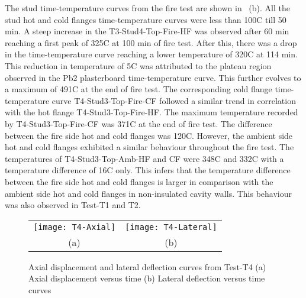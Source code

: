The stud time-temperature curves from the fire test are shown in ~(b). All the stud hot and cold flanges time-temperature curves were less than 100\degree C till 50 min. A steep increase in the T3-Stud4-Top-Fire-HF was observed after 60 min reaching a first peak of 325\degree C at 100 min of fire test. After this, there was a drop in the time-temperature curve reaching a lower temperature of 320\degree C at 114 min. This reduction in temperature of 5\degree C was attributed to the plateau region observed in the Pb2 plasterboard time-temperature curve. This further evolves to a maximum of 491\degree C at the end of fire test. The corresponding cold flange time-temperature curve T4-Stud3-Top-Fire-CF followed a similar trend in correlation with the hot flange T4-Stud3-Top-Fire-HF. The maximum temperature recorded by T4-Stud3-Top-Fire-CF was 371\degree C at the end of fire test. The difference between the fire side hot and cold flanges was 120\degree C. However, the ambient side hot and cold flanges exhibited a similar behaviour throughout the fire test. The temperatures of T4-Stud3-Top-Amb-HF and CF were 348\degree C and 332\degree C with a temperature difference of 16\degree C only. This infers that the temperature difference between the fire side hot and cold flanges is larger in comparison with the ambient side hot and cold flanges in non-insulated cavity walls. This behaviour was also observed in Test-T1 and T2.
\begin{figure}[!htbp]
	\centering
		\begin{tabular}{cc}
			\texttt{[image: T4-Axial]} & \texttt{[image: T4-Lateral]} \\
			(a) & (b) \\
		\end{tabular} 
		\caption{Axial displacement and lateral deflection curves from Test-T4 (a) Axial displacement versus time (b) Lateral deflection versus time curves}
		\label{fig:T4-Axial-Lateral}
\end{figure}

